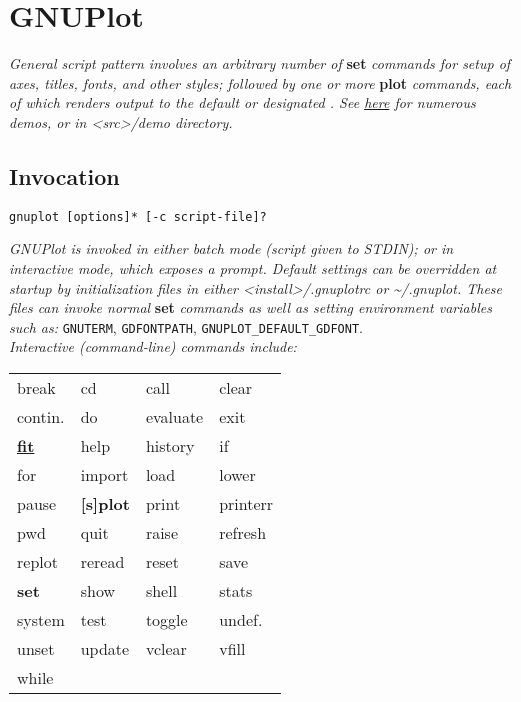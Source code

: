 \section{GNUPlot}
\textit{General script pattern involves an arbitrary number of }\textbf{set}\textit{ commands for setup of axes, titles, fonts, and other styles; followed by one or more }\textbf{plot}\textit{ commands, each of which renders output to the default or designated . See \href{http://gnuplot.info/demos/}{here} for numerous demos, or in <src>/demo directory.}


\subsection*{Invocation}
\begin{lstlisting}
gnuplot [options]* [-c script-file]?
\end{lstlisting}

\textit{GNUPlot is invoked in either batch mode (script given to STDIN); or in interactive mode, which exposes a prompt. Default settings can be overridden at startup by initialization files in either <install>/.gnuplotrc or \textasciitilde /.gnuplot. These files can invoke normal }\textbf{set}\textit{ commands as well as setting environment variables such as: } \texttt{GNUTERM}, \texttt{GDFONTPATH}, \texttt{GNUPLOT\_DEFAULT\_GDFONT}. \\[2mm]
\textit{Interactive (command-line) commands include:} 
{\footnotesize 
\begin{tabular}{l l l l}
    break       & cd            & call      &   clear   \\
    contin.     & do            & evaluate  &   exit    \\      
    \href{http://www.gnuplot.info/demo/fit.html}{\textbf{fit}}  & help        & history   & if        \\
    for         & import        & load      & lower     \\
    pause       & \textbf{[s]plot}  & print & printerr  \\
    pwd         & quit          & raise     & refresh   \\
    replot      & reread        & reset     & save      \\
    \textbf{set}  & show        & shell     & stats     \\
    system      & test          & toggle    & undef.    \\
    unset       & update        & vclear    & vfill     \\
    while
\end{tabular}}


